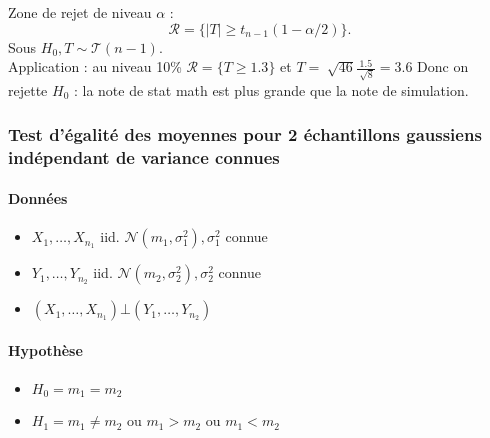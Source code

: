 \documentclass{article}
\theoremstyle{plain}%
\theoremstyle{definition}
\theoremstyle{remark}
\begin{document}
Zone de rejet de niveau $ \alpha  $ : 
\[
    \mathcal{R} = \{\left| T \right| \geq t_{n-1} (1- \alpha /2)\}
.\]
Sous $ H_0, T \sim \mathcal{T}(n-1) $. \\
Application : au niveau 10\% $ \mathcal{R}=\{T \geq 1.3\} $ et $ T = \sqrt[]{46}\frac{1.5}{\sqrt[]{8}} = 3.6 $ Donc on rejette $ H_0 $ : la note de stat math est plus grande que la note de simulation.


\subsubsection{Test d'égalité des moyennes pour 2 échantillons gaussiens indépendant de variance connues}

\paragraph*{Données}
\begin{itemize}
    \item $ X_1, \dots, X_{n_1}  $ iid. $ \mathcal{N}(m_1, \sigma_1 ^2), \sigma_1^2 $ connue
    \item $ Y_1, \dots, Y_{n_2}  $ iid. $ \mathcal{N}(m_2, \sigma_2 ^2), \sigma_2^2 $ connue
    \item $ (X_1, \dots, X_{n_1}) \bot (Y_1, \dots, Y_{n_2}) $ 
\end{itemize}

\paragraph*{Hypothèse}
\begin{itemize}
    \item $ H_0 = m_1 = m_2 $ 
    \item $ H_1 = m_1 \neq m_2 $ ou $ m_1 > m_2 $ ou $ m_1 < m_2 $ 
\end{itemize}
\end{document}
